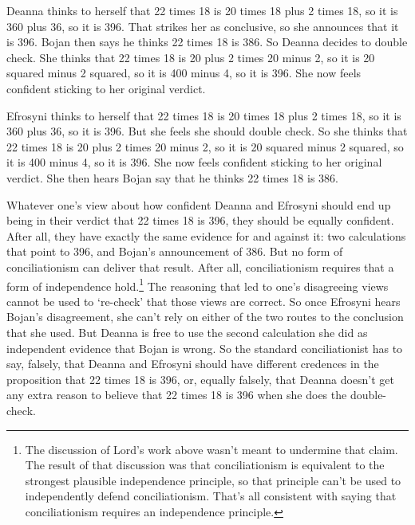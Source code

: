 \gls{Deanna} thinks to herself that 22 times 18 is 20 times 18 plus 2 times 18, so it is 360 plus 36, so it is 396. That strikes her as conclusive, so she announces that it is 396. \gls{Bojan} then says he thinks 22 times 18 is 386. So \gls{Deanna} decides to double check. She thinks that 22 times 18 is 20 plus 2 times 20 minus 2, so it is 20 squared minus 2 squared, so it is 400 minus 4, so it is 396. She now feels confident sticking to her original verdict.

\gls{Efrosyni} thinks to herself that 22 times 18 is 20 times 18 plus 2 times 18, so it is 360 plus 36, so it is 396. But she feels she should double check. So she thinks that 22 times 18 is 20 plus 2 times 20 minus 2, so it is 20 squared minus 2 squared, so it is 400 minus 4, so it is 396. She now feels confident sticking to her original verdict. She then hears \gls{Bojan} say that he thinks 22 times 18 is 386.

Whatever one's view about how confident \gls{Deanna} and \gls{Efrosyni} should end up being in their verdict that 22 times 18 is 396, they should be equally confident. After all, they have exactly the same evidence for and against it: two calculations that point to 396, and \gls{Bojan}'s announcement of 386. But no form of conciliationism can deliver that result. After all, conciliationism requires that a form of independence hold.\footnote{The discussion of Lord's work above wasn't meant to undermine that claim. The result of that discussion was that conciliationism is equivalent to the strongest plausible independence principle, so that principle can't be used to independently defend conciliationism. That's all consistent with saying that conciliationism requires an independence principle.} The reasoning that led to one's disagreeing views cannot be used to `re-check' that those views are correct. So once \gls{Efrosyni} hears \gls{Bojan}'s disagreement, she can't rely on either of the two routes to the conclusion that she used. But \gls{Deanna} is free to use the second calculation she did as independent evidence that \gls{Bojan} is wrong. So the standard conciliationist has to say, falsely, that \gls{Deanna} and \gls{Efrosyni} should have different credences in the proposition that 22 times 18 is 396, or, equally falsely, that \gls{Deanna} doesn't get any extra reason to believe that 22 times 18 is 396 when she does the double-check.

